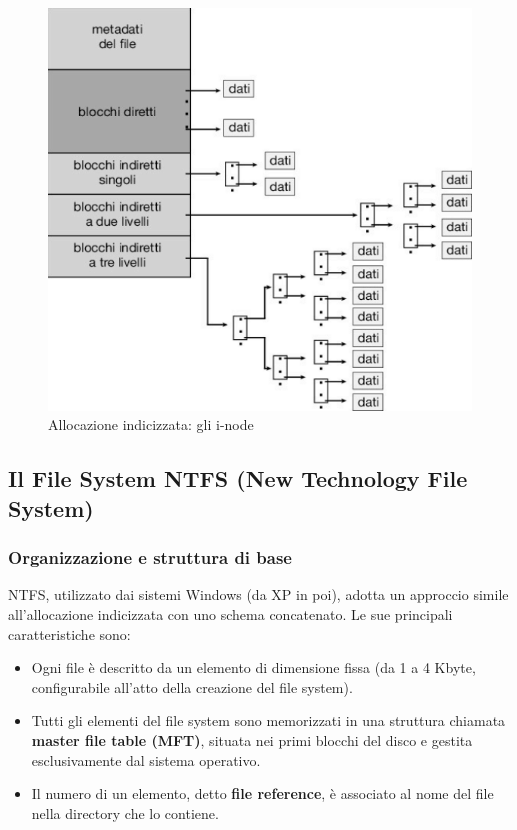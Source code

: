 

\begin{figure}[h] \centering \includegraphics[width=0.50\linewidth]{images/i_node_indicizzati.png} \caption{Allocazione indicizzata: gli i-node} \label{fig:14.8} \end{figure}

\subsection{Il File System NTFS (New Technology File System)}
\subsubsection{Organizzazione e struttura di base}
NTFS, utilizzato dai sistemi Windows (da XP in poi), adotta un approccio simile all'allocazione indicizzata con uno schema concatenato. Le sue principali caratteristiche sono:
\begin{itemize}
    \item Ogni file è descritto da un elemento di dimensione fissa (da 1 a 4 Kbyte, configurabile all’atto della creazione del file system).
    \item Tutti gli elementi del file system sono memorizzati in una struttura chiamata \textbf{master file table (MFT)}, situata nei primi blocchi del disco e gestita esclusivamente dal sistema operativo.
    \item Il numero di un elemento, detto \textbf{file reference}, è associato al nome del file nella directory che lo contiene.
\end{itemize}

